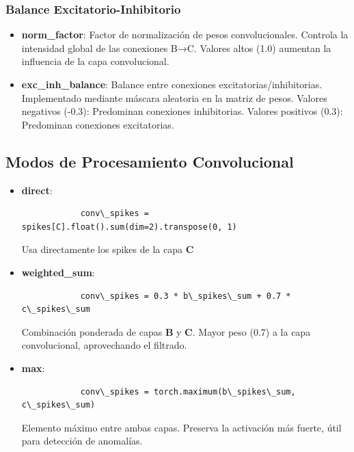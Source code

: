 \subsubsection{Balance Excitatorio-Inhibitorio}

\begin{itemize}
    \item \textbf{norm\_factor}: Factor de normalización de pesos convolucionales. Controla la intensidad global de las conexiones B→C. Valores altos (1.0) aumentan la influencia de la capa convolucional.
    \item \textbf{exc\_inh\_balance}: Balance entre conexiones excitatorias/inhibitorias. Implementado mediante máscara aleatoria en la matriz de pesos. Valores negativos (-0.3): Predominan conexiones inhibitorias. Valores positivos (0.3): Predominan conexiones excitatorias.
\end{itemize}

\subsection{Modos de Procesamiento Convolucional}







\begin{itemize}
    \item \textbf{direct}:
        \begin{lstlisting}
            conv\_spikes = spikes[C].float().sum(dim=2).transpose(0, 1)
        \end{lstlisting}
        
        Usa directamente los spikes de la capa \textbf{C}
    \item \textbf{weighted\_sum}:
        \begin{lstlisting}
            conv\_spikes = 0.3 * b\_spikes\_sum + 0.7 * c\_spikes\_sum
        \end{lstlisting}
        
        Combinación ponderada de capas \textbf{B} y \textbf{C}. Mayor peso (0.7) a la capa convolucional, aprovechando el filtrado.
    \item \textbf{max}:
        \begin{lstlisting}
            conv\_spikes = torch.maximum(b\_spikes\_sum, c\_spikes\_sum)
        \end{lstlisting}
        
        Elemento máximo entre ambas capas. Preserva la activación más fuerte, útil para detección de anomalías.
\end{itemize}

